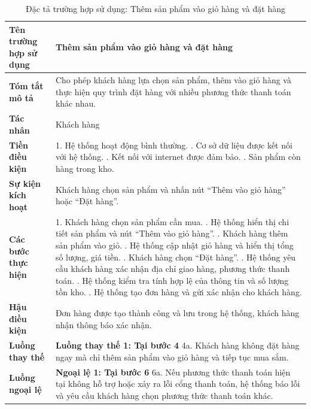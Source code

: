 {
\begin{longtable}{|>{\bfseries}p{4cm}|p{11.5cm}|}
\caption{Đặc tả trường hợp sử dụng: Thêm sản phẩm vào giỏ hàng và đặt hàng}
\label{tab:uc-add-to-cart-checkout} \\
\hline
\textbf{Tên trường hợp sử dụng} & Thêm sản phẩm vào giỏ hàng và đặt hàng \\
\hline
\textbf{Tóm tắt mô tả} & Cho phép khách hàng lựa chọn sản phẩm, thêm vào giỏ hàng và thực hiện quy trình đặt hàng với nhiều phương thức thanh toán khác nhau. \\
\hline
\textbf{Tác nhân} & Khách hàng \\
\hline
\textbf{Tiền điều kiện} & 1. Hệ thống hoạt động bình thường. \newline
2. Cơ sở dữ liệu được kết nối với hệ thống. \newline
3. Kết nối với internet được đảm bảo. \newline
4. Sản phẩm còn hàng trong kho. \\
\hline
\textbf{Sự kiện kích hoạt} & Khách hàng chọn sản phẩm và nhấn nút “Thêm vào giỏ hàng” hoặc “Đặt hàng”. \\
\hline
\textbf{Các bước thực hiện} & 1. Khách hàng chọn sản phẩm cần mua. \newline
2. Hệ thống hiển thị chi tiết sản phẩm và nút “Thêm vào giỏ hàng”. \newline
3. Khách hàng thêm sản phẩm vào giỏ. \newline
4. Hệ thống cập nhật giỏ hàng và hiển thị tổng số lượng, giá tiền. \newline
5. Khách hàng chọn “Đặt hàng”. \newline
6. Hệ thống yêu cầu khách hàng xác nhận địa chỉ giao hàng, phương thức thanh toán. \newline
7. Hệ thống kiểm tra tính hợp lệ của thông tin và số lượng tồn kho. \newline
8. Hệ thống tạo đơn hàng và gửi xác nhận cho khách hàng. \\
\hline
\textbf{Hậu điều kiện} & Đơn hàng được tạo thành công và lưu trong hệ thống, khách hàng nhận thông báo xác nhận. \\
\hline
\textbf{Luồng thay thế} & \textbf{Luồng thay thế 1: Tại bước 4} \newline
4a. Khách hàng không đặt hàng ngay mà chỉ thêm sản phẩm vào giỏ hàng và tiếp tục mua sắm. \\
\hline
\textbf{Luồng ngoại lệ} & \textbf{Ngoại lệ 1: Tại bước 6} \newline
6a. Nếu phương thức thanh toán hiện tại không hỗ trợ hoặc xảy ra lỗi cổng thanh toán, hệ thống báo lỗi và yêu cầu khách hàng chọn phương thức thanh toán khác. \\
\hline
\end{longtable}

}
